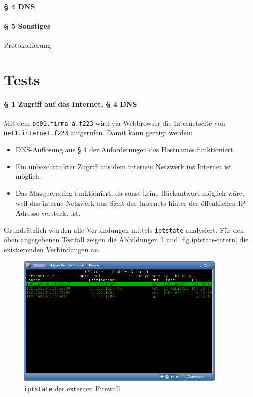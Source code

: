 
\paragraph{§ 4 DNS}


\paragraph{§ 5 Sonstiges}


Protokollierung


\newpage
\section{Tests}\label{sec.tests}

\paragraph{§ 1 Zugriff auf das Internet, § 4 DNS}

Mit dem {\tt pc01.firma-a.f223} wird via Webbrowser die Internetseite
von {\tt net1.internet.f223} aufgerufen.
Damit kann gezeigt werden:
\begin{itemize}
  \item DNS-Auflösung aus § 4 der Anforderungen des Hostnames funktioniert.
  \item Ein unbeschränkter Zugriff aus dem internen Netzwerk ins Internet
        ist möglich.
  \item Das Masquerading funktioniert, da sonst keine Rückantwort möglich wäre,
        weil das interne Netzwerk aus Sicht des Internets hinter der
        öffentlichen IP-Adresse versteckt ist.
\end{itemize}

\noindent Grundsätzlich wurden alle Verbindungen mittels {\tt iptstate} analysiert.
Für den oben angegebenen Testfall zeigen die Abbildungen
\ref{fig.iptstate-extern} und \ref{fig.iptstate-intern} die existierenden
Verbindungen an.

\begin{figure}[h!]
  \centering
    \includegraphics[width=0.9\textwidth]{figures/iptstate-extern.png}
  \caption{{\tt iptstate} der externen Firewall.}
  \label{fig.iptstate-extern}
\end{figure}

